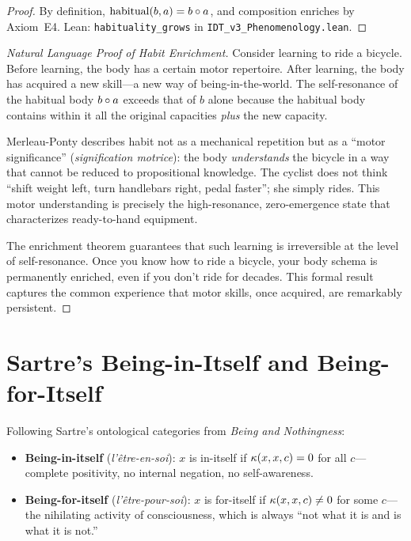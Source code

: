 \begin{proof}
By definition, $\mathrm{habitual}(b, a) = b \circ a$, and composition
enriches by Axiom~E4.
Lean: \texttt{habituality\_grows} in \texttt{IDT\_v3\_Phenomenology.lean}.
\end{proof}

\begin{proof}[Natural Language Proof of Habit Enrichment]
Consider learning to ride a bicycle.  Before learning, the body has a certain
motor repertoire.  After learning, the body has acquired a new skill---a new
way of being-in-the-world.  The self-resonance of the habitual body
$b \circ a$ exceeds that of $b$ alone because the habitual body contains
within it all the original capacities \emph{plus} the new capacity.

Merleau-Ponty describes habit not as a mechanical repetition but as a ``motor
significance'' (\textit{signification motrice}): the body \emph{understands}
the bicycle in a way that cannot be reduced to propositional knowledge.  The
cyclist does not think ``shift weight left, turn handlebars right, pedal
faster''; she simply rides.  This motor understanding is precisely the
high-resonance, zero-emergence state that characterizes ready-to-hand
equipment.

The enrichment theorem guarantees that such learning is irreversible at the
level of self-resonance.  Once you know how to ride a bicycle, your body
schema is permanently enriched, even if you don't ride for decades.  This
formal result captures the common experience that motor skills, once acquired,
are remarkably persistent.
\end{proof}

\section{Sartre's Being-in-Itself and Being-for-Itself}

\begin{definition}
\label{def:sartre-being}
Following Sartre's ontological categories from \textit{Being and Nothingness}:
\begin{itemize}
\item \textbf{Being-in-itself} (\textit{l'\^{e}tre-en-soi}): $x$ is in-itself if
$\kappa(x, x, c) = 0$ for all $c$---complete positivity, no internal
negation, no self-awareness.
\item \textbf{Being-for-itself} (\textit{l'\^{e}tre-pour-soi}): $x$ is for-itself
if $\kappa(x, x, c) \neq 0$ for some $c$---the nihilating activity of
consciousness, which is always ``not what it is and is what it is not.''
\end{itemize}
\end{definition}

